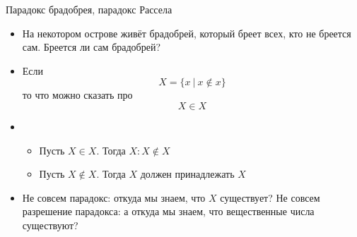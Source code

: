 \documentclass[aspectratio=169]{beamer}
\begin{document}
%

\begin{frame}{Парадокс брадобрея, парадокс Рассела}

\begin{itemize}
\item На некотором острове живёт брадобрей, который бреет всех, кто не бреется
сам. Бреется ли сам брадобрей? \pause
\item Если
$$X = \{ x \ |\ x \notin x\}$$ \pause
то что можно сказать про
$$X \in X$$ \pause

\item \begin{itemize}
\item Пусть $X \in X$. Тогда $X : X \notin X$\pause
\item Пусть $X \notin X$. Тогда $X$ должен принадлежать $X$\pause
\end{itemize}

\item Не совсем парадокс: откуда мы знаем, что $X$ существует? \pause
Не совсем разрешение парадокса: а откуда мы знаем, что вещественные числа существуют?
\end{itemize}
\end{frame}
\end{document}
